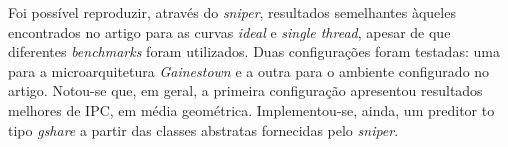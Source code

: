 \documentclass[12pt]{article}
\begin{document}
Foi possível reproduzir, através do \textit{sniper}, resultados semelhantes
àqueles encontrados no artigo para as curvas \textit{ideal} e \textit{single
thread}, apesar de que diferentes \textit{benchmarks} foram utilizados. Duas
configurações foram testadas: uma para a microarquitetura \textit{Gainestown} e
a outra para o ambiente configurado no artigo. Notou-se que, em geral, a
primeira configuração apresentou resultados melhores de IPC, em média
geométrica. Implementou-se, ainda, um preditor to tipo \textit{gshare} a partir
das classes abstratas fornecidas pelo \textit{sniper}.




\end{document}
